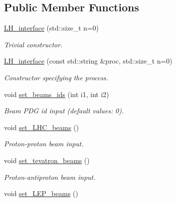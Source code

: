 \subsection*{Public Member Functions}
\begin{DoxyCompactItemize}
\item 
\hyperlink{a00322_a5cb39be90d6edeec70a0c78327b1cec8}{L\-H\-\_\-interface} (std\-::size\-\_\-t n=0)
\begin{DoxyCompactList}\small\item\em Trivial constructor. \end{DoxyCompactList}\item 
\hyperlink{a00322_aa0b7c09c288d4823915af9032ad92a82}{L\-H\-\_\-interface} (const std\-::string \&proc, std\-::size\-\_\-t n=0)
\begin{DoxyCompactList}\small\item\em Constructor specifying the process. \end{DoxyCompactList}\item 
\hypertarget{a00322_af0b374043930699a78a0dec0c77998cf}{void \hyperlink{a00322_af0b374043930699a78a0dec0c77998cf}{set\-\_\-beams\-\_\-ids} (int i1, int i2)}\label{a00322_af0b374043930699a78a0dec0c77998cf}

\begin{DoxyCompactList}\small\item\em Beam P\-D\-G id input (default values\-: 0). \end{DoxyCompactList}\item 
\hypertarget{a00322_a385a610b35ae425024a6727eef94f000}{void \hyperlink{a00322_a385a610b35ae425024a6727eef94f000}{set\-\_\-\-L\-H\-C\-\_\-beams} ()}\label{a00322_a385a610b35ae425024a6727eef94f000}

\begin{DoxyCompactList}\small\item\em Proton-\/proton beam input. \end{DoxyCompactList}\item 
\hypertarget{a00322_afaf2108e359fb46a83a5d743fb1ff36e}{void \hyperlink{a00322_afaf2108e359fb46a83a5d743fb1ff36e}{set\-\_\-tevatron\-\_\-beams} ()}\label{a00322_afaf2108e359fb46a83a5d743fb1ff36e}

\begin{DoxyCompactList}\small\item\em Proton-\/antiproton beam input. \end{DoxyCompactList}\item 
\hypertarget{a00322_a3b34726638267a141d17d464f5228740}{void \hyperlink{a00322_a3b34726638267a141d17d464f5228740}{set\-\_\-\-L\-E\-P\-\_\-beams} ()}\label{a00322_a3b34726638267a141d17d464f5228740}


\end{DoxyCompactItemize}
